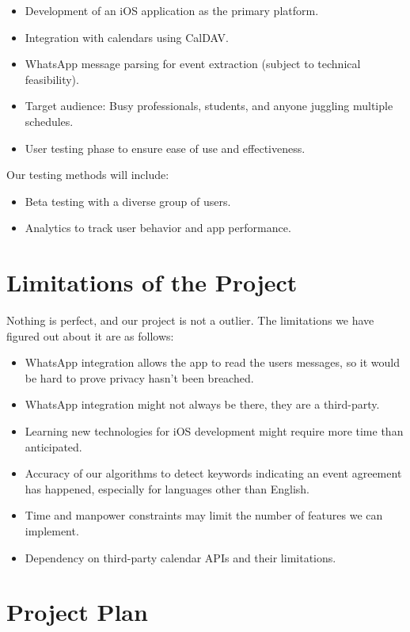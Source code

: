 \documentclass[12pt,a4paper]{article}
\begin{document}
\begin{itemize}
    \item Development of an iOS application as the primary platform.
    \item Integration with calendars using CalDAV.
    \item WhatsApp message parsing for event extraction (subject to technical feasibility).
    \item Target audience: Busy professionals, students, and anyone juggling multiple schedules.
    \item User testing phase to ensure ease of use and effectiveness.
\end{itemize}

Our testing methods will include:
\begin{itemize}
    \item Beta testing with a diverse group of users.
    \item Analytics to track user behavior and app performance.
\end{itemize}

\section{Limitations of the Project}

Nothing is perfect, and our project is not a outlier. The limitations we have figured out about it are as follows:

\begin{itemize}
    \item WhatsApp integration allows the app to read the users messages, so it would be hard to prove privacy hasn't been breached.
    \item WhatsApp integration might not always be there, they are a third-party.
    \item Learning new technologies for iOS development might require more time than anticipated.
    \item Accuracy of our algorithms to detect keywords indicating an event agreement has happened, especially for languages other than English.
    \item Time and manpower constraints may limit the number of features we can implement.
    \item Dependency on third-party calendar APIs and their limitations.
\end{itemize}

\section{Project Plan}
\end{document}
